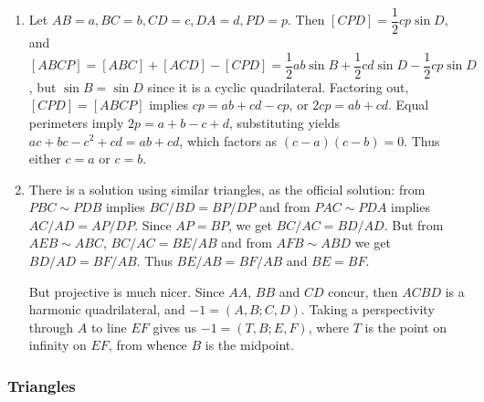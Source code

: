 \documentclass[10pt,paper=letter]{scrartcl}
\begin{document}
\begin{enumerate}
\item Let $AB = a, BC = b, CD = c, DA = d, PD = p$. Then $[CPD] = \dfrac12 cp\sin D$, and $[ABCP] = [ABC] + [ACD] - [CPD] = \dfrac12ab \sin B + \dfrac12cd \sin D - \dfrac12cp \sin D$, but $\sin B = \sin D$ since it is a cyclic quadrilateral. Factoring out, $[CPD] = [ABCP]$ implies $cp = ab + cd - cp$, or $2cp = ab + cd$. Equal perimeters imply $2p = a + b - c + d$, substituting yields $ac + bc - c^2 + cd = ab + cd$, which factors as $(c - a)(c - b) = 0$. Thus either $c = a$ or $c = b$.

\item There is a solution using similar triangles, as the official solution: from $PBC \sim PDB$ implies $BC/BD = BP/DP$ and from $PAC \sim PDA$ implies $AC/AD = AP/DP$. Since $AP = BP$, we get $BC/AC = BD/AD$. But from $AEB \sim ABC$, $BC/AC = BE/AB$ and from $AFB \sim ABD$ we get $BD/AD = BF/AB$. Thus $BE/AB = BF/AB$ and $BE = BF$.

But projective is much nicer. Since $AA$, $BB$ and $CD$ concur, then $ACBD$ is a harmonic quadrilateral, and $-1 = (A, B; C, D)$. Taking a perspectivity through $A$ to line $EF$ gives us $-1 = (T, B; E, F)$, where $T$ is the point on infinity on $EF$, from whence $B$ is the midpoint.

\end{enumerate}

\subsubsection*{Triangles}
\end{document}
